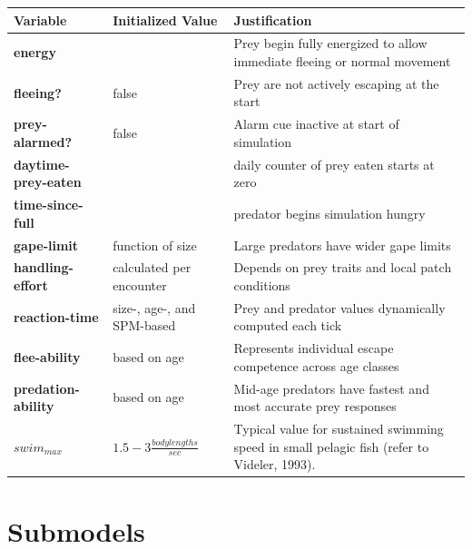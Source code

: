 \documentclass[
]{book}
\begin{document}
\begin{longtable}[]{@{}
  >{\centering\arraybackslash}p{}
  >{\centering\arraybackslash}p{}
  >{\centering\arraybackslash}p{}@{}}
\toprule\noalign{}
\begin{minipage}[b]{\linewidth}\centering
Variable
\end{minipage} & \begin{minipage}[b]{\linewidth}\centering
Initialized Value
\end{minipage} & \begin{minipage}[b]{\linewidth}\centering
Justification
\end{minipage} \\
\midrule\noalign{}
\endhead
\bottomrule\noalign{}
\endlastfoot
\textbf{energy} & 100 & Prey begin fully energized to allow immediate fleeing or normal movement \\
\textbf{fleeing?} & false & Prey are not actively escaping at the start \\
\textbf{prey-alarmed?} & false & Alarm cue inactive at start of simulation \\
\textbf{daytime-prey-eaten} & 0 & daily counter of prey eaten starts at zero \\
\textbf{time-since-full} & 0 & predator begins simulation hungry \\
\textbf{gape-limit} & function of size & Large predators have wider gape limits \\
\textbf{handling-effort} & calculated per encounter & Depends on prey traits and local patch conditions \\
\textbf{reaction-time} & size-, age-, and SPM-based & Prey and predator values dynamically computed each tick \\
\textbf{flee-ability} & based on age & Represents individual escape competence across age classes \\
\textbf{predation-ability} & based on age & Mid-age predators have fastest and most accurate prey responses \\
\(swim_{max}\) & \(1.5-3 \frac{body lengths}{sec}\) & Typical value for sustained swimming speed in small pelagic fish (refer to Videler, 1993). \\
\end{longtable}

\section{Submodels}\label{submodels-10}
\end{document}

